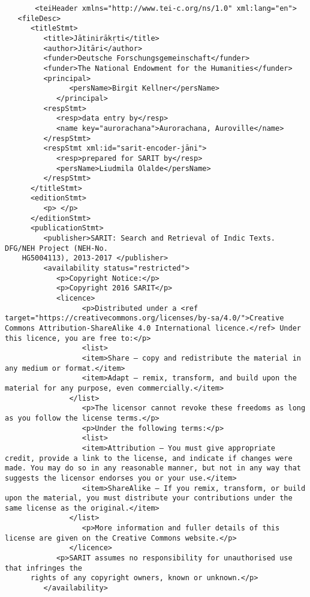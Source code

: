 \documentclass[article,12pt,a4paper]{memoir}%
\begin{document}
	 \begin{verbatim}
       <teiHeader xmlns="http://www.tei-c.org/ns/1.0" xml:lang="en">
   <fileDesc>
      <titleStmt>
         <title>Jātinirākṛti</title>
         <author>Jitāri</author>
         <funder>Deutsche Forschungsgemeinschaft</funder>
         <funder>The National Endowment for the Humanities</funder>
         <principal>
	           <persName>Birgit Kellner</persName>
	        </principal>
         <respStmt>
            <resp>data entry by</resp>
            <name key="aurorachana">Aurorachana, Auroville</name>
         </respStmt>
         <respStmt xml:id="sarit-encoder-jāni">
            <resp>prepared for SARIT by</resp>
            <persName>Liudmila Olalde</persName>
         </respStmt>
      </titleStmt>
      <editionStmt>
         <p> </p>
      </editionStmt>
      <publicationStmt>
         <publisher>SARIT: Search and Retrieval of Indic Texts. DFG/NEH Project (NEH-No.
	HG5004113), 2013-2017 </publisher>
         <availability status="restricted">
            <p>Copyright Notice:</p>
            <p>Copyright 2016 SARIT</p>
            <licence> 
	              <p>Distributed under a <ref target="https://creativecommons.org/licenses/by-sa/4.0/">Creative Commons Attribution-ShareAlike 4.0 International licence.</ref> Under this licence, you are free to:</p>
	              <list>
                  <item>Share — copy and redistribute the material in any medium or format.</item>
                  <item>Adapt — remix, transform, and build upon the material for any purpose, even commercially.</item>
               </list>
	              <p>The licensor cannot revoke these freedoms as long as you follow the license terms.</p>
	              <p>Under the following terms:</p>
	              <list>
                  <item>Attribution — You must give appropriate credit, provide a link to the license, and indicate if changes were made. You may do so in any reasonable manner, but not in any way that suggests the licensor endorses you or your use.</item>
                  <item>ShareAlike — If you remix, transform, or build upon the material, you must distribute your contributions under the same license as the original.</item>
               </list>
	              <p>More information and fuller details of this license are given on the Creative Commons website.</p>
	           </licence>
            <p>SARIT assumes no responsibility for unauthorised use that infringes the
	  rights of any copyright owners, known or unknown.</p>
         </availability>

\end{verbatim}
\end{document}
